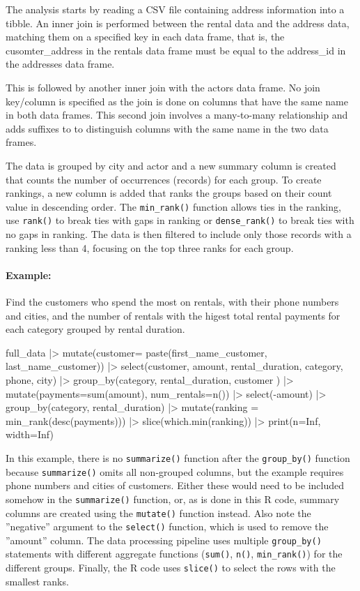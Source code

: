 The analysis starts by reading a CSV file containing address information into a tibble. An inner join is performed between the rental data and the address data, matching them on a specified key in each data frame, that is, the cusomter\_address in the rentals data frame must be equal to the address\_id in the addresses data frame. 

This is followed by another inner join with the actors data frame. No join key/column is specified as the join is done on columns that have the same name in both data frames. This second join involves a many-to-many relationship and adds suffixes to to distinguish columns with the same name in the two data frames.

The data is grouped by city and actor and a new summary column is created that counts the number of occurrences (records) for each group. To create rankings, a new column is added that ranks the groups based on their count value in descending order. The \texttt{min\_rank()} function allows ties in the ranking, use \texttt{rank()} to break ties with gaps in ranking or \texttt{dense\_rank()} to break ties with no gaps in ranking. The data is then filtered to include only those records with a ranking less than 4, focusing on the top three ranks for each group.


\paragraph*{Example:} Find the customers who spend the most on rentals, with their phone numbers and cities, and the number of rentals with the higest total rental payments for each category grouped by rental duration.

\begin{samepage}
\begin{Rcode}
full_data |>
   mutate(customer= paste(first_name_customer, last_name_customer)) |>
   select(customer, amount, rental_duration, category, phone, city) |>
   group_by(category, rental_duration, customer ) |>
   mutate(payments=sum(amount), num_rentals=n()) |>
   select(-amount) |>
   group_by(category, rental_duration) |>
   mutate(ranking = min_rank(desc(payments))) |>
   slice(which.min(ranking)) |>
   print(n=Inf, width=Inf)
\end{Rcode}
\end{samepage}

In this example, there is no \texttt{summarize()} function after the \texttt{group\_by()} function because \texttt{summarize()} omits all non-grouped columns, but the example requires phone numbers and cities of customers. Either these would need to be included somehow in the \texttt{summarize()} function, or, as is done in this R code, summary columns are created using the \texttt{mutate()} function instead.  Also note the ''negative'' argument to the \texttt{select()} function, which is used to remove the ''amount'' column. The data processing pipeline uses multiple \texttt{group\_by()} statements with different aggregate functions (\texttt{sum()}, \texttt{n()}, \texttt{min\_rank()}) for the different groups. Finally, the R code uses \texttt{slice()} to select the rows with the smallest ranks.

